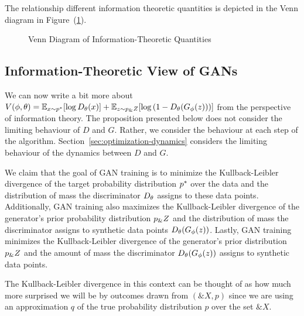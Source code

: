   The relationship different information theoretic quantities is depicted in the
  Venn diagram in Figure~(\ref{fig:venn-information}).

\begin{figure}[h!]
  \centering
  \caption{Venn Diagram of Information-Theoretic Quantities}%
  \label{fig:venn-information}
\end{figure}

\subsection{Information-Theoretic View of GANs}%
\label{sec:info-value-function}%

We can now write a bit more about $V(\phi, \theta) = \mathbb{E}_{x \sim p^*}[{\log
  D_\theta(x)}] + \mathbb{E}_{z \sim p_\&Z}[\log{(1 - D_\theta(G_\phi(z)))}]$ from
the perspective of information theory. The proposition presented below does not
consider the limiting behaviour of $D$ and $G$. Rather, we consider the
behaviour at each step of the algorithm. Section~\ref{sec:optimization-dynamics}
considers the limiting behaviour of the dynamics between $D$ and $G$.

We claim that the goal of GAN training is to minimize the Kullback-Leibler
divergence of the target probability distribution $p^*$ over the data and the
distribution of mass the discriminator $D_\theta$ assigns to these data points.
Additionally, GAN training also maximizes the Kullback-Leibler divergence of the
generator's prior probability distribution $p_\&Z$ and the distribution of mass
the discriminator assigns to synthetic data points $D_\theta(G_\phi(z))$. Lastly, GAN
training minimizes the Kullback-Leibler divergence of the generator's prior
distribution $p_\&Z$ and the amount of mass the discriminator $D_\theta(G_\phi(z))$ assigns
to synthetic data points.

\begin{remark}
  The Kullback-Leibler divergence in this context can be thought of as how much
  more surprised we will be by outcomes drawn from $(\&X, p)$ since we are using
  an approximation $q$ of the true probability distribution $p$ over the set
  $\&X$.
\end{remark}

